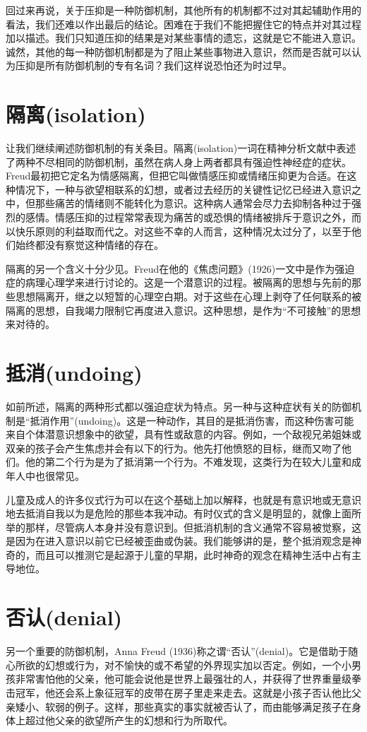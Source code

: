 \documentclass[UTF8,10pt,a4paper,openany]{book}
\begin{document}
回过来再说，关于压抑是一种防御机制，其他所有的机制都不过对其起辅助作用的看法，我们还难以作出最后的结论。困难在于我们不能把握住它的特点并对其过程加以描述。我们只知道压抑的结果是对某些事情的遗忘，这就是它不能进入意识。诚然，其他的每一种防御机制都是为了阻止某些事物进入意识，然而是否就可以认为压抑是所有防御机制的专有名词？我们这样说恐怕还为时过早。

\section*{隔离(isolation)}
让我们继续阐述防御机制的有关条目。隔离(isolation)一词在精神分析文献中表述了两种不尽相同的防御机制，虽然在病人身上两者都具有强迫性神经症的症状。Freud最初把它定名为情感隔离，但把它叫做情感压抑或情绪压抑更为合适。在这种情况下，一种与欲望相联系的幻想，或者过去经历的关键性记忆已经进入意识之中，但那些痛苦的情绪则不能转化为意识。这种病人通常会尽力去抑制各种过于强烈的感情。情感压抑的过程常常表现为痛苦的或恐惧的情绪被排斥于意识之外，而以快乐原则的利益取而代之。对这些不幸的人而言，这种情况太过分了，以至于他们始终都没有察觉这种情绪的存在。

隔离的另一个含义十分少见。Freud在他的《焦虑问题》(1926)一文中是作为强迫症的病理心理学来进行讨论的。这是一个潜意识的过程。被隔离的思想与先前的那些思想隔离开，继之以短暂的心理空白期。对于这些在心理上剥夺了任何联系的被隔离的思想，自我竭力限制它再度进入意识。这种思想，是作为“不可接触”的思想来对待的。

\section*{抵消(undoing)}
如前所述，隔离的两种形式都以强迫症状为特点。另一种与这种症状有关的防御机制是“抵消作用”(undoing)。这是一种动作，其目的是抵消伤害，而这种伤害可能来自个体潜意识想象中的欲望，具有性或敌意的内容。例如，一个敌视兄弟姐妹或双亲的孩子会产生焦虑并会有以下的行为。他先打他愤怒的目标，继而又吻了他们。他的第二个行为是为了抵消第一个行为。不难发现，这类行为在较大儿童和成年人中也很常见。

儿童及成人的许多仪式行为可以在这个基础上加以解释，也就是有意识地或无意识地去抵消自我以为是危险的那些本我冲动。有时仪式的含义是明显的，就像上面所举的那样，尽管病人本身并没有意识到。但抵消机制的含义通常不容易被觉察，这是因为在进入意识以前它已经被歪曲或伪装。我们能够讲的是，整个抵消观念是神奇的，而且可以推测它是起源于儿童的早期，此时神奇的观念在精神生活中占有主导地位。

\section*{否认(denial)}
另一个重要的防御机制，Anna Freud (1936)称之谓“否认”(denial)。它是借助于随心所欲的幻想或行为，对不愉快的或不希望的外界现实加以否定。例如，一个小男孩非常害怕他的父亲，他可能会说他是世界上最强壮的人，并获得了世界重量级拳击冠军，他还会系上象征冠军的皮带在房子里走来走去。这就是小孩子否认他比父亲矮小、软弱的例子。这样，那些真实的事实就被否认了，而由能够满足孩子在身体上超过他父亲的欲望所产生的幻想和行为所取代。
\end{document}
